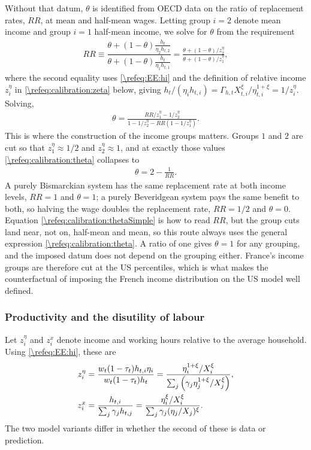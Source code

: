Without that datum, $\theta$ is identified from OECD data on the ratio of replacement rates, $RR$, at mean and half-mean wages. Letting group $i=2$ denote mean income and group $i=1$ half-mean income, we solve for $\theta$ from the requirement
\begin{align}\label{\refeq:calibration:RR}
        RR \equiv \dfrac{\theta+(1-\theta)\frac{h_t}{\eta_2 h_{t,2}}}{\theta+(1-\theta)\frac{h_t}{\eta_1 h_{t,1}}} = \frac{\theta + (1-\theta)/z_2^{\eta}}{\theta+(1-\theta)/z_1^{\eta}},
\end{align}
where the second equality uses \eqref{\refeq:EE:hi} and the definition of relative income $z_i^{\eta}$ in \eqref{\refeq:calibration:zeta} below, giving $h_t/(\eta_ih_{t,i}) = \Gamma_{h,t}X_{t,i}^{\xi}/\eta_{t,i}^{1+\xi} = 1/z_i^{\eta}$. Solving,
\begin{align}\label{\refeq:calibration:theta}
    \theta = \frac{RR/z_1^{\eta} - 1/z_2^{\eta}}{1-1/z_2^{\eta}-RR\left(1-1/z_1^{\eta}\right)}.
\end{align}
This is where the construction of the income groups matters. Groups $1$ and $2$ are cut so that $z_1^{\eta}\approx 1/2$ and $z_2^{\eta}\approx 1$, and at exactly those values \eqref{\refeq:calibration:theta} collapses to
\begin{align}\label{\refeq:calibration:thetaSimple}
    \theta = 2-\frac{1}{RR}.
\end{align}
A purely Bismarckian system has the same replacement rate at both income levels, $RR = 1$ and $\theta = 1$; a purely Beveridgean system pays the same benefit to both, so halving the wage doubles the replacement rate, $RR = 1/2$ and $\theta = 0$. Equation \eqref{\refeq:calibration:thetaSimple} is how to read $RR$, but the group cuts land near, not on, half-mean and mean, so this route always uses the general expression \eqref{\refeq:calibration:theta}. A ratio of one gives $\theta = 1$ for any grouping, and the imposed datum does not depend on the grouping either. France's income groups are therefore cut at the US percentiles, which is what makes the counterfactual of imposing the French income distribution on the US model well defined.


\subsubsection{Productivity and the disutility of labour}\label{\refsec:calibration:etaX}
Let $z_i^{\eta}$ and $z_i^{x}$ denote income and working hours relative to the average household. Using \eqref{\refeq:EE:hi}, these are
\begin{align}\label{\refeq:calibration:zeta}
        z_i^{\eta} &= \dfrac{w_t(1-\tau_t)h_{t,i} \eta_i}{w_t(1-\tau_t)h_t} = \dfrac{\eta_i^{1+\xi}/X_i^{\xi}}{\sum_{j} \left(\gamma_ j\eta_j^{1+\xi}/X_j^{\xi}\right)},  \\
        z_i^{x} &= \frac{h_{t,i}}{\sum_j\gamma_jh_{t,j}} = \frac{\eta_i^{\xi}/X_i^{\xi}}{\sum_j \gamma_j(\eta_j/X_j)^{\xi}}. \notag
\end{align}
The two model variants differ in whether the second of these is data or prediction.

